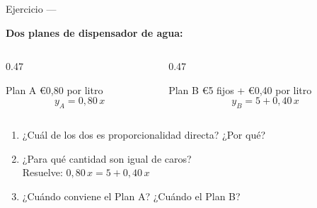 \documentclass[aspectratio=169, 10pt, spanish]{beamer}
\begin{document}
\begin{frame}{Ejercicio — }
  \begin{analizarbox}
    \textbf{Dos planes de dispensador de agua:}

    \vspace{0.2cm}
    \begin{columns}[t]
      \begin{column}{0.47\textwidth}
        \begin{block}{Plan A}
          €0{,}80 por litro\\
          \[y_A = 0{,}80\,x\]
        \end{block}
      \end{column}
      \begin{column}{0.47\textwidth}
        \begin{alertblock}{Plan B}
          €5 fijos + €0{,}40 por litro\\
          \[y_B = 5 + 0{,}40\,x\]
        \end{alertblock}
      \end{column}
    \end{columns}
    \vspace{0.3cm}
    \begin{enumerate}
      \item ¿Cuál de los dos es proporcionalidad directa? ¿Por qué?
      \item ¿Para qué cantidad son igual de caros?\\
            Resuelve: $0{,}80\,x = 5 + 0{,}40\,x$
      \item ¿Cuándo conviene el Plan A? ¿Cuándo el Plan B?
    \end{enumerate}
  \end{analizarbox}
\end{frame}
\end{document}
